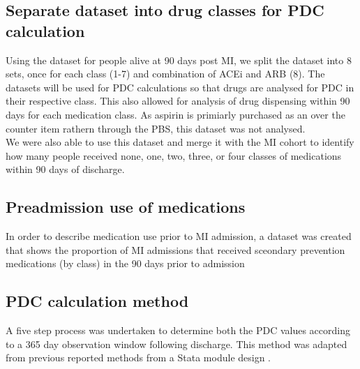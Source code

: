 \documentclass[11pt]{article}
\begin{document}
\subsection{Separate dataset into drug classes for PDC calculation}
Using the dataset for people alive at 90 days post MI, we split the dataset into 8 sets, once for each class (1-7) and combination of ACEi and ARB (8). The datasets will be used for PDC calculations so that drugs are analysed for PDC in their respective class. This also allowed for analysis of drug dispensing within 90 days for each medication class. As aspirin is primiarly purchased as an over the counter item rathern through the PBS, this dataset was not analysed. \\
We were also able to use this dataset and merge it with the MI cohort to identify how many people received none, one, two, three, or four classes of medications within 90 days of discharge.
\color{violet}
\begin{stlog}\end{stlog}
\color{black}
\subsection{Preadmission use of medications}
In order to describe medication use prior to MI admission, a dataset was created that shows the proportion of MI admissions that received sceondary prevention medications (by class) in the 90 days prior to admission
\color{violet}
\begin{stlog}\end{stlog}
\color{black}
\subsection{PDC calculation method}
A five step process was undertaken to determine both the PDC values according to a 365 day observation window following discharge. This method was adapted from previous reported methods from a Stata module design \cite{pdcstata2019}. 
\end{document}
